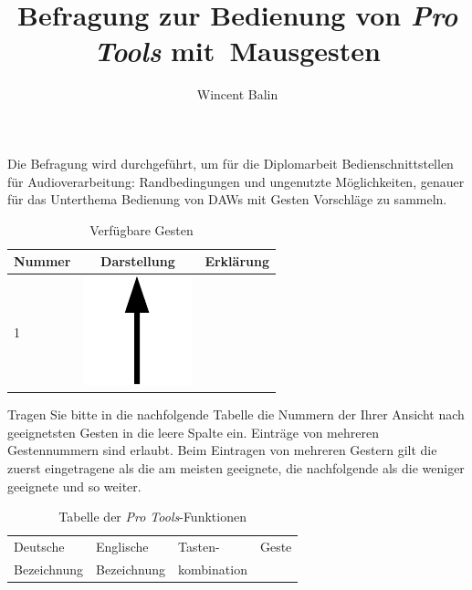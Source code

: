 \documentclass[11pt,a4paper,notitlepage]{article}
\author{Wincent Balin}
\title{Befragung zur Bedienung von \emph{Pro Tools} mit~Mausgesten}
\begin{document}
\maketitle

Die Befragung wird durchgeführt, um für die Diplomarbeit
\textsf{Bedienschnittstellen für Audioverarbeitung: Randbedingungen und ungenutzte Möglichkeiten},
genauer für das Unterthema \textsf{Bedienung von DAWs mit Gesten} Vorschläge zu sammeln.

\begin{table}[ht] \label{tab:Gestures}
\centering
\begin{tabular}{lcl} \toprule
Nummer & Darstellung & Erklärung \\ \midrule \midrule
 1 & \includegraphics[scale=0.25]{img/up} & \\ \midrule
\end{tabular}
\caption{Verfügbare Gesten}
\end{table}

Tragen Sie bitte in die nachfolgende Tabelle die Nummern der Ihrer Ansicht nach geeignetsten Gesten
in die leere Spalte ein. Einträge von mehreren Gestennummern sind erlaubt. Beim Eintragen von mehreren
Gestern gilt die zuerst eingetragene als die am meisten geeignete, die nachfolgende als die weniger geeignete
und so weiter.

\begin{table}[ht] \label{tab:Functions}
\centering
\begin{tabular}{llll} \toprule
Deutsche & Englische & Tasten- & Geste \\
Bezeichnung & Bezeichnung & kombination &  \\ \midrule \midrule
\end{tabular}
\caption{Tabelle der \emph{Pro Tools}-Funktionen}
\end{table}
\end{document}
